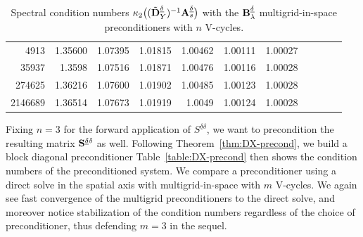 \documentclass[11pt,a4paper,oneside,english]{amsart}
\numberwithin{equation}{section}
\numberwithin{theorem}{section}
\theoremstyle{definition}
\newcommand{\udelta}{{\underline{\delta}}}
\newcommand{\jw}[1]{{\color{red}{JW: #1}}}
\begin{document}
\begin{table}
\begin{tabular}{rrrrrrrrrrr}
    4913    & 1.35600    & 1.07395  & 1.01815  & 1.00462  & 1.00111  & 1.00027 \\
    35937   & 1.3598   & 1.07516  & 1.01871  & 1.00476  & 1.00116  & 1.00028 \\
    274625  & 1.36216  & 1.07600    & 1.01902  & 1.00485  & 1.00123  & 1.00028 \\
    2146689  & 1.36514  & 1.07673    & 1.01919  & 1.0049  & 1.00124  & 1.00028
    \\\bottomrule
  \end{tabular}
  \caption{Spectral condition numbers $\kappa_2\big((\tilde {\bf D}_Y^\udelta)^{-1} {\bf A}_s^{\udelta}\big)$ with the ${\bf B}_\lambda^\udelta$ multigrid-in-space preconditioners with $n$ V-cycles.\jw{wording; ik wacht nog op numres}}
  \label{table:DY-precond}
\end{table}

Fixing $n=3$ for the forward application of $S^{\udelta \delta}$, we want to precondition
the resulting matrix ${\bf S}^{\udelta \delta}$ as well. Following Theorem~\ref{thm:DX-precond},
we build a block diagonal preconditioner
Table~\ref{table:DX-precond} then shows the condition numbers of the preconditioned
system. We compare a preconditioner using a direct solve in the spatial axis with
multigrid-in-space with $m$ V-cycles. We again see fast convergence of the multigrid
preconditioners to the direct solve, and moreover notice stabilization of the condition
numbers regardless of the choice of preconditioner, thus defending $m=3$ in the sequel.
\end{document}
